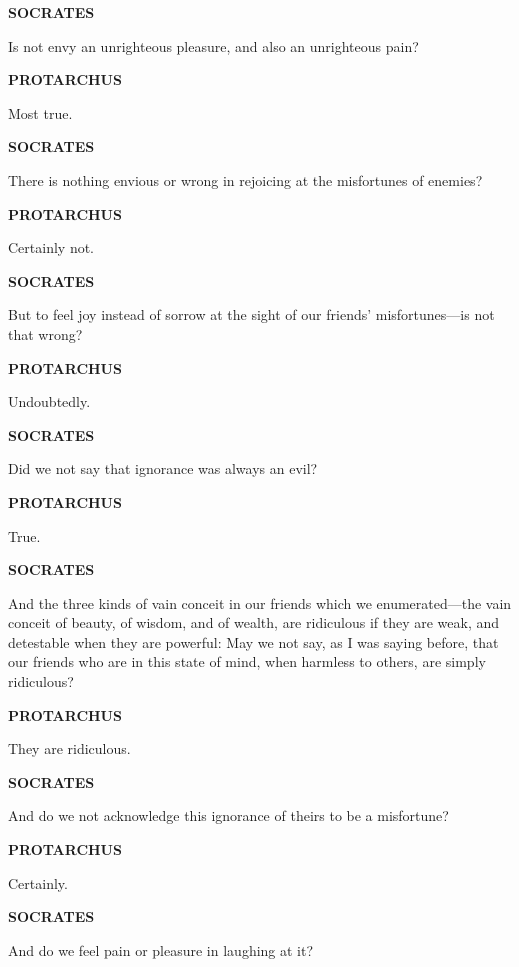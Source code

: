 \documentclass[11pt,letter]{article}
\begin{document}
\par \textbf{SOCRATES}
\par   Is not envy an unrighteous pleasure, and also an unrighteous pain?

\par \textbf{PROTARCHUS}
\par   Most true.

\par \textbf{SOCRATES}
\par   There is nothing envious or wrong in rejoicing at the misfortunes of enemies?

\par \textbf{PROTARCHUS}
\par   Certainly not.

\par \textbf{SOCRATES}
\par   But to feel joy instead of sorrow at the sight of our friends' misfortunes—is not that wrong?

\par \textbf{PROTARCHUS}
\par   Undoubtedly.

\par \textbf{SOCRATES}
\par   Did we not say that ignorance was always an evil?

\par \textbf{PROTARCHUS}
\par   True.

\par \textbf{SOCRATES}
\par   And the three kinds of vain conceit in our friends which we enumerated—the vain conceit of beauty, of wisdom, and of wealth, are ridiculous if they are weak, and detestable when they are powerful:  May we not say, as I was saying before, that our friends who are in this state of mind, when harmless to others, are simply ridiculous?

\par \textbf{PROTARCHUS}
\par   They are ridiculous.

\par \textbf{SOCRATES}
\par   And do we not acknowledge this ignorance of theirs to be a misfortune?

\par \textbf{PROTARCHUS}
\par   Certainly.

\par \textbf{SOCRATES}
\par   And do we feel pain or pleasure in laughing at it?
\end{document}

